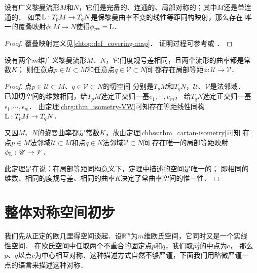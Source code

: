 
\begin{theorem}\label{chhss:thm_CAH-iso}    
    设有广义黎曼流形$M$和$N$，它们是完备的、连通的、局部对称的；其中$M$还是单连通的．
    如果${\rm L}: T_p M \to T_q N$是保黎曼曲率不变的线性等距同构映射，那么存在
    唯一的覆叠映射$\phi:M\to N$使得$\phi_{p*} = {\rm L}$．
\end{theorem}
\begin{proof}
    覆叠映射定义见\ref{chtop:def_covering-map}．
    证明过程可参考\parencite[8.17]{oneill1983}或
    \parencite[2.3.11]{wolf_SCC-2011}．
\end{proof}


\begin{theorem}\label{chhss:thm_const-curvature}
    设有两个$m$维广义黎曼流形$M$、$N$，它们度规号差相同，且两个流形的曲率都是常数$K$；
    则任意点$p\in \mathscr{U}\subset M$和任意点$q\in \mathscr{V}\subset N$间
    都存在局部等距$\phi:\mathscr{U}\to \mathscr{V}$．
\end{theorem}
\begin{proof}
    点$p\in \mathscr{U}\subset M$、$q\in \mathscr{V}\subset N$的切空间
    分别是$T_p M$和$T_q N$，$\mathscr{U}$、$\mathscr{V}$是法邻域．
    已知切空间的维数相同，给$T_p M$选定正交归一基$e_1,\cdots,e_m$，
    给$T_q N$选定正交归一基$\epsilon_1,\cdots,\epsilon_m$．
    由定理\ref{chrg:thm_isometry-VW}可知存在{\kaishu 等距线性同构}${\rm L}:T_p M\to T_q N$．
    
    又因$M$、$N$的黎曼曲率都是常数$K$，故由定理\ref{chhss:thm_cartan-isometry}可知
    在点$p\in M$法邻域$\mathscr{U}\subset M$和点$q\in N$法邻域$\mathscr{V}\subset N$间
    存在唯一的局部等距映射$\phi_{\rm L}:\mathscr{U}\to \mathscr{V}$．
    
    此定理是在说：在局部等距同构意义下，定理中描述的空间是{\kaishu 唯一的}；
    即相同的维数、相同的度规号差、相同的曲率$K$决定了{\kaishu 常曲率}空间的{\kaishu 惟一性}．
\end{proof}


\section{整体对称空间初步}
我们先从正定的欧几里得空间谈起．设$\mathbb{R}^m$为$m$维欧氏空间，它同时又是一个实线性空间．
在欧氏空间中任取两个不重合的固定点$p$和$q$，我们取$\overrightarrow{pq}$的中点为$c$，
那么$p$、$q$以点$c$为中心相互对称．这种描述方式自然不够严谨，下面我们用略微严谨一点的语言来描述这种对称．

